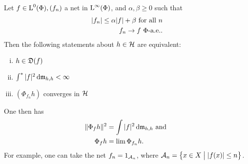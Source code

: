 \begin{lem}
  \label{maintheorem2}
Let $f \in {\text{L}^0}(\Phi), (f_n)$ a net in ${\text{L}^\infty}(\Phi)$, and 
$\alpha, \beta \geq 0$ such that
 \begin{align*}
   | f_n | \leq \alpha |f| + \beta \text{ for all } n \\
   f_n \to f ~\Phi\text{-a.e.}.
 \end{align*}
Then the following statements about $h \in \mathcal{H}$ are equivalent:
\begin{enumerate}[(i)]
 \item $h \in \mathfrak{D}(f)$
 \item $\int ^{*} | f| ^2 \operatorname{d}\! \mathfrak{m}_{h,h} < \infty$
 \item $(\Phi_{f_n}h)$ converges in $ \mathcal{H}$
\end{enumerate}
One then has
\begin{align*}
  \| \Phi_f h \| ^2 &= \int |f|^2 \operatorname{d}\! \mathfrak{m}_{h, h } \text{ and }\\
  \Phi_{f }h &= \lim \Phi_{f_n} h.
\end{align*}
For example, one can take the net $f_n = 1_{\mathcal{A}_n}$, where $\mathcal{A}_n = 
\left\lbrace x \in X \bigm | | f(x) | \leq n \right\rbrace$.
\end{lem}

